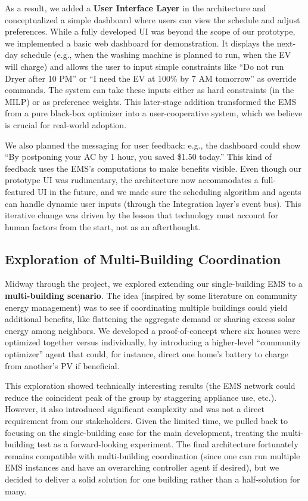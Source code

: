 \documentclass[12pt,a4paper]{article}
\begin{document}
As a result, we added a \textbf{User Interface Layer} in the architecture and conceptualized a simple dashboard where users can view the schedule and adjust preferences. While a fully developed UI was beyond the scope of our prototype, we implemented a basic web dashboard for demonstration. It displays the next-day schedule (e.g., when the washing machine is planned to run, when the EV will charge) and allows the user to input simple constraints like “Do not run Dryer after 10 PM” or “I need the EV at 100\% by 7 AM tomorrow” as override commands. The system can take these inputs either as hard constraints (in the MILP) or as preference weights. This later-stage addition transformed the EMS from a pure black-box optimizer into a user-cooperative system, which we believe is crucial for real-world adoption.

We also planned the messaging for user feedback: e.g., the dashboard could show “By postponing your AC by 1 hour, you saved \$1.50 today.” This kind of feedback uses the EMS’s computations to make benefits visible. Even though our prototype UI was rudimentary, the architecture now accommodates a full-featured UI in the future, and we made sure the scheduling algorithm and agents can handle dynamic user inputs (through the Integration layer’s event bus). This iterative change was driven by the lesson that technology must account for human factors from the start, not as an afterthought.

\subsection{Exploration of Multi-Building Coordination}
Midway through the project, we explored extending our single-building EMS to a \textbf{multi-building scenario}. The idea (inspired by some literature on community energy management) was to see if coordinating multiple buildings could yield additional benefits, like flattening the aggregate demand or sharing excess solar energy among neighbors. We developed a proof-of-concept where six houses were optimized together versus individually, by introducing a higher-level “community optimizer” agent that could, for instance, direct one home’s battery to charge from another’s PV if beneficial.

This exploration showed technically interesting results (the EMS network could reduce the coincident peak of the group by staggering appliance use, etc.). However, it also introduced significant complexity and was not a direct requirement from our stakeholders. Given the limited time, we pulled back to focusing on the single-building case for the main development, treating the multi-building test as a forward-looking experiment. The final architecture fortunately remains compatible with multi-building coordination (since one can run multiple EMS instances and have an overarching controller agent if desired), but we decided to deliver a solid solution for one building rather than a half-solution for many.
\end{document}
